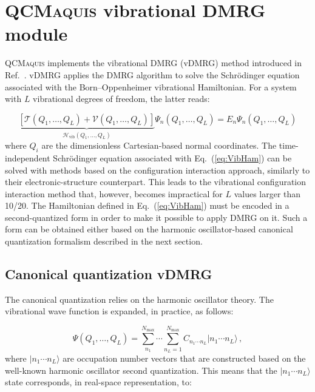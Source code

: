 \documentclass[bibliography=totoc,12pt,a4paper]{scrartcl}
\newcommand{\qcm}{\textsc{QCMaquis}}
\begin{document}
\section{\qcm{} vibrational DMRG module}
\label{sec:vDMRG}

\qcm{} implements the vibrational DMRG (vDMRG) method introduced in Ref.~.
vDMRG applies the DMRG algorithm to solve the Schr\"odinger equation associated with the Born--Oppenheimer vibrational Hamiltonian.
For a system with $L$ vibrational degrees of freedom, the latter reads:

\begin{equation}
  \underbrace{\left[ \mathcal{T}(Q_1, \ldots, Q_L) + \mathcal{V}(Q_1, \ldots, Q_L) \right]}_{\mathcal{H}_\text{vib}(Q_1, \ldots, Q_L)} \Psi_n(Q_1, \ldots, Q_L) = E_n \Psi_n(Q_1, \ldots, Q_L)
  \label{eq:VibHam}
\end{equation}
%
where $Q_i$ are the dimensionless Cartesian-based normal coordinates.
The time-independent Schr\"odinger equation associated with Eq.~(\ref{eq:VibHam}) can be solved with methods based on the configuration interaction approach, similarly to their electronic-structure counterpart.
This leads to the vibrational configuration interaction method that, however, becomes impractical for $L$ values larger than 10/20.
The Hamiltonian defined in Eq.~(\ref{eq:VibHam}) must be encoded in a second-quantized form in order to make it possible to apply DMRG on it.
Such a form can be obtained either based on the harmonic oscillator-based canonical quantization formalism\cite{Hirata2014_NormalOrdered} described in the next section.

\subsection{Canonical quantization vDMRG}
\label{sec:canonical}

The canonical quantization relies on the harmonic oscillator theory.\cite{Hirata2014_NormalOrdered}
The vibrational wave function is expanded, in practice, as follows:

\begin{equation}
  \Psi(Q_1, \ldots, Q_L) = \sum_{n_1}^{N_\text{max}} \cdots \sum_{n_L=1}^{N_\text{max}}
	C_{n_1 \cdots n_L} | n_1 \cdots n_L \rangle \, ,
  \label{eq:CanonicalQuantizationCI}
\end{equation}
%
where $| n_1 \cdots n_L \rangle$ are occupation number vectors that are constructed based on the well-known harmonic oscillator second quantization.
This means that the $| n_1 \cdots n_L \rangle$ state corresponds, in real-space representation, to:
\end{document}

